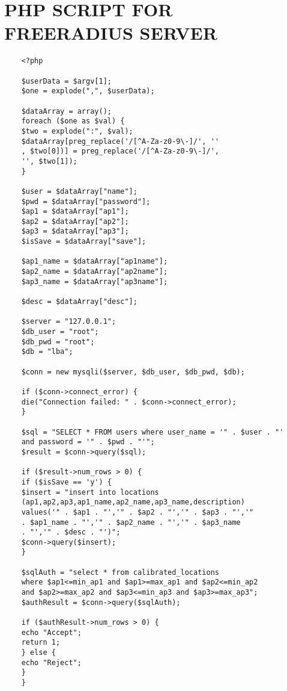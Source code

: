 \documentclass{report}
\begin{document}
	\chapter{PHP SCRIPT FOR FREERADIUS SERVER}
	\label{php_script}
	\begin{lstlisting}
	<?php
	
	$userData = $argv[1];			
	$one = explode(",", $userData);
	
	$dataArray = array();
	foreach ($one as $val) {
	$two = explode(":", $val);
	$dataArray[preg_replace('/[^A-Za-z0-9\-]/', ''
	, $two[0])] = preg_replace('/[^A-Za-z0-9\-]/',
	'', $two[1]);
	}
	
	$user = $dataArray["name"];
	$pwd = $dataArray["password"];
	$ap1 = $dataArray["ap1"];
	$ap2 = $dataArray["ap2"];
	$ap3 = $dataArray["ap3"];
	$isSave = $dataArray["save"];
	
	$ap1_name = $dataArray["ap1name"];
	$ap2_name = $dataArray["ap2name"];
	$ap3_name = $dataArray["ap3name"];
	
	$desc = $dataArray["desc"];
	
	$server = "127.0.0.1";
	$db_user = "root";
	$db_pwd = "root";
	$db = "lba";
	
	$conn = new mysqli($server, $db_user, $db_pwd, $db);
	
	if ($conn->connect_error) {
	die("Connection failed: " . $conn->connect_error);
	}
	
	$sql = "SELECT * FROM users where user_name = '" . $user . "'
	and password = '" . $pwd . "'";
	$result = $conn->query($sql);
	
	if ($result->num_rows > 0) {
	if ($isSave == 'y') {
	$insert = "insert into locations 
	(ap1,ap2,ap3,ap1_name,ap2_name,ap3_name,description) 
	values('" . $ap1 . "','" . $ap2 . "','" . $ap3 . "','" 
	. $ap1_name . "','" . $ap2_name . "','" . $ap3_name 
	. "','" . $desc . "')";
	$conn->query($insert);
	}
	
	$sqlAuth = "select * from calibrated_locations 
	where $ap1<=min_ap1 and $ap1>=max_ap1 and $ap2<=min_ap2 
	and $ap2>=max_ap2 and $ap3<=min_ap3 and $ap3>=max_ap3";
	$authResult = $conn->query($sqlAuth);
	
	if ($authResult->num_rows > 0) {	 			
	echo "Accept";
	return 1;
	} else {
	echo "Reject";
	}
	}
	\end{lstlisting} 
	
\end{document}
